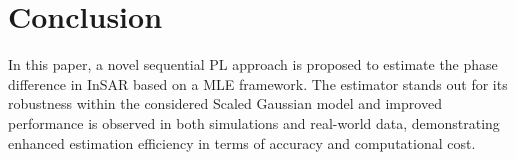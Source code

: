\section{Conclusion}

In this paper, a novel sequential \acs{PL} approach is proposed to estimate the phase difference in \acs{InSAR} based on a \acs{MLE} framework. The estimator stands out for its robustness within the considered Scaled Gaussian model and improved performance is observed in both simulations and real-world data, demonstrating enhanced estimation efficiency in terms of accuracy and computational cost.